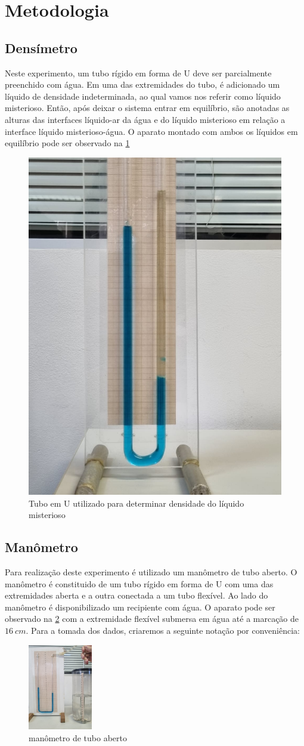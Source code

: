 \section{Metodologia}
\subsection{Densímetro}
    Neste experimento, um tubo rígido em forma de U deve ser parcialmente
    preenchido com água. Em uma das extremidades do tubo, é adicionado um
    líquido de densidade indeterminada, ao qual vamos nos referir como líquido
    misterioso. Então, após deixar o sistema entrar em equilíbrio, são anotadas
    as alturas das interfaces líquido-ar da água e do líquido misterioso em
    relação a interface líquido misterioso-água. O aparato montado com ambos os
    líquidos em equilíbrio pode ser observado na \cref{h2mist}
    
    \begin{figure}[H]
        \centering
        \includegraphics[width=0.25\linewidth]{fig/liquido_mis.jpeg}
        \caption{Tubo em U utilizado para determinar densidade do líquido
        misterioso}
        \label{h2mist}
    \end{figure}

\subsection{Manômetro}
    Para realização deste experimento é utilizado um manômetro de tubo aberto. O
    manômetro é constituido de um tubo rígido em forma de U com uma das
    extremidades aberta e a outra conectada a um tubo flexível. Ao lado do
    manômetro é disponibilizado um recipiente com água. O aparato pode ser
    observado na \cref{manometro} com a extremidade flexível submersa em água
    até a marcação de \(\qty{16}{cm}\). Para a tomada dos dados, criaremos a
    seguinte notação por conveniência:

    \begin{figure}[H]
        \centering
        \includegraphics[width=0.25\textwidth]{fig/man_1.jpeg}
        \caption{manômetro de tubo aberto}
        \label{manometro}
    \end{figure}

